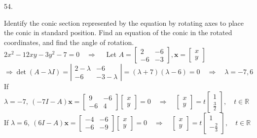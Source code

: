 \documentclass[12pt]{book}
\newcounter{sect}
\begin{document}
\begin{CJK}{UTF8}{bsmi}
54. \begin{minipage}[t]{\dimexpr\linewidth-2em}
Identify the conic section represented by the equation by rotating axes to place the conic in standard position. Find an equation of the conic in the rotated coordinates, and find the angle of rotation. \\
$2x^2-12xy-3y^2-7=0\quad\Rightarrow\quad$ Let $A=\begin{bmatrix}
2 & -6 \\
-6 & -3
\end{bmatrix},\textbf{x}=\begin{bmatrix}
x \\ y
\end{bmatrix}$ \\
$\Rightarrow\det(A-\lambda I)=\left|\begin{matrix}
2-\lambda & -6 \\
-6 & -3-\lambda
\end{matrix}\right|=(\lambda+7)(\lambda-6)=0\quad\Rightarrow\quad\lambda=-7, 6$ \\
If $\lambda=-7,\ (-7I-A)\textbf{x}=\begin{bmatrix}
9 & -6 \\
-6 & 4
\end{bmatrix}\begin{bmatrix}
x \\ y
\end{bmatrix}=0\quad\Rightarrow\quad\begin{bmatrix}
x \\ y
\end{bmatrix}=t\begin{bmatrix}
1 \\ \frac{3}{2}
\end{bmatrix},\quad t\in\mathbb{R}$ \\
If $\lambda=6,\ (6I-A)\textbf{x}=\begin{bmatrix}
-4 & -6 \\
-6 & -9
\end{bmatrix}\begin{bmatrix}
x \\ y
\end{bmatrix}=0\quad\Rightarrow\quad\begin{bmatrix}
x \\ y
\end{bmatrix}=t\begin{bmatrix}
1 \\ -\frac{2}{3}
\end{bmatrix},\quad t\in\mathbb{R}$ \\

\end{minipage}
\end{CJK}
\end{document}
